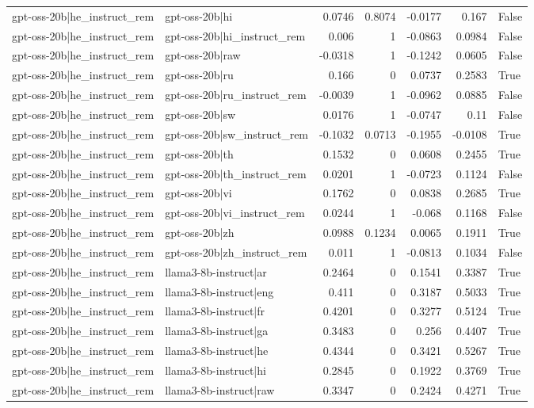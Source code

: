 \begin{table}
\begin{tabular}{l l r r r r l}
gpt-oss-20b|he_instruct_rem & gpt-oss-20b|hi & 0.0746 & 0.8074 & -0.0177 & 0.167 & False \\
gpt-oss-20b|he_instruct_rem & gpt-oss-20b|hi_instruct_rem & 0.006 & 1 & -0.0863 & 0.0984 & False \\
gpt-oss-20b|he_instruct_rem & gpt-oss-20b|raw & -0.0318 & 1 & -0.1242 & 0.0605 & False \\
gpt-oss-20b|he_instruct_rem & gpt-oss-20b|ru & 0.166 & 0 & 0.0737 & 0.2583 & True \\
gpt-oss-20b|he_instruct_rem & gpt-oss-20b|ru_instruct_rem & -0.0039 & 1 & -0.0962 & 0.0885 & False \\
gpt-oss-20b|he_instruct_rem & gpt-oss-20b|sw & 0.0176 & 1 & -0.0747 & 0.11 & False \\
gpt-oss-20b|he_instruct_rem & gpt-oss-20b|sw_instruct_rem & -0.1032 & 0.0713 & -0.1955 & -0.0108 & True \\
gpt-oss-20b|he_instruct_rem & gpt-oss-20b|th & 0.1532 & 0 & 0.0608 & 0.2455 & True \\
gpt-oss-20b|he_instruct_rem & gpt-oss-20b|th_instruct_rem & 0.0201 & 1 & -0.0723 & 0.1124 & False \\
gpt-oss-20b|he_instruct_rem & gpt-oss-20b|vi & 0.1762 & 0 & 0.0838 & 0.2685 & True \\
gpt-oss-20b|he_instruct_rem & gpt-oss-20b|vi_instruct_rem & 0.0244 & 1 & -0.068 & 0.1168 & False \\
gpt-oss-20b|he_instruct_rem & gpt-oss-20b|zh & 0.0988 & 0.1234 & 0.0065 & 0.1911 & True \\
gpt-oss-20b|he_instruct_rem & gpt-oss-20b|zh_instruct_rem & 0.011 & 1 & -0.0813 & 0.1034 & False \\
gpt-oss-20b|he_instruct_rem & llama3-8b-instruct|ar & 0.2464 & 0 & 0.1541 & 0.3387 & True \\
gpt-oss-20b|he_instruct_rem & llama3-8b-instruct|eng & 0.411 & 0 & 0.3187 & 0.5033 & True \\
gpt-oss-20b|he_instruct_rem & llama3-8b-instruct|fr & 0.4201 & 0 & 0.3277 & 0.5124 & True \\
gpt-oss-20b|he_instruct_rem & llama3-8b-instruct|ga & 0.3483 & 0 & 0.256 & 0.4407 & True \\
gpt-oss-20b|he_instruct_rem & llama3-8b-instruct|he & 0.4344 & 0 & 0.3421 & 0.5267 & True \\
gpt-oss-20b|he_instruct_rem & llama3-8b-instruct|hi & 0.2845 & 0 & 0.1922 & 0.3769 & True \\
gpt-oss-20b|he_instruct_rem & llama3-8b-instruct|raw & 0.3347 & 0 & 0.2424 & 0.4271 & True \\

\end{tabular}
\end{table}
